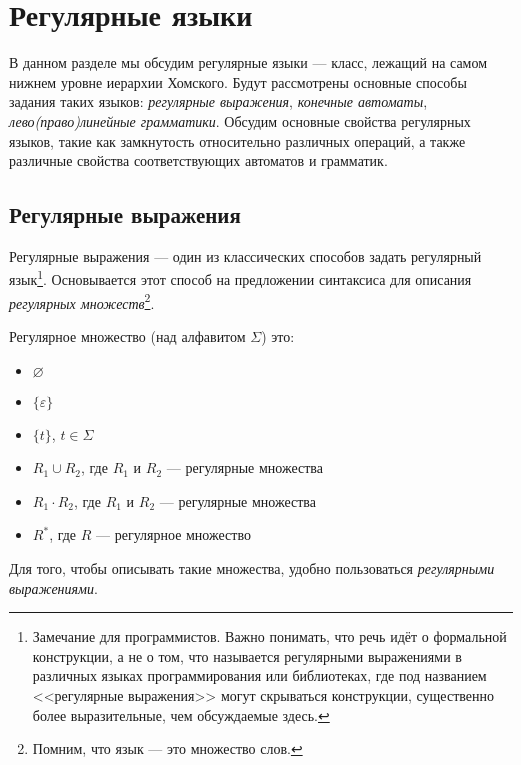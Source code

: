 \chapter{Регулярные языки}


В данном разделе мы обсудим регулярные языки --- класс, лежащий на самом нижнем уровне иерархии Хомского.
Будут рассмотрены основные способы задания таких языков: \textit{регулярные выражения}, \textit{конечные автоматы}, \textit{лево(право)линейные грамматики}.
Обсудим основные свойства регулярных языков, такие как замкнутость относительно различных операций, а также различные свойства соответствующих автоматов и грамматик.


\section{Регулярные выражения}

Регулярные выражения --- один из классических способов задать регулярный язык\footnote{Замечание для программистов. Важно понимать, что речь идёт о формальной конструкции, а не о том, что называется регулярными выражениями в различных языках программирования или библиотеках, где под названием <<регулярные выражения>> могут скрываться конструкции, существенно более выразительные, чем обсуждаемые здесь.}.
Основывается этот способ на предложении синтаксиса для описания \textit{регулярных множеств}\footnote{Помним, что язык --- это множество слов.}.

\begin{definition}
    Регулярное множество (над алфавитом $\Sigma$) это:
    \begin{itemize}
        \item $\varnothing$
        \item $\{\varepsilon\}$
        \item $\{t\}$, $t \in \Sigma$
        \item $R_1 \cup R_2$, где $R_1$ и $R_2$ --- регулярные множества
        \item $R_1 \cdot R_2$, где $R_1$ и $R_2$ --- регулярные множества
        \item $R^*$, где $R$ --- регулярное множество
    \end{itemize}
\end{definition}

Для того, чтобы описывать такие множества, удобно пользоваться \textit{регулярными выражениями}.

